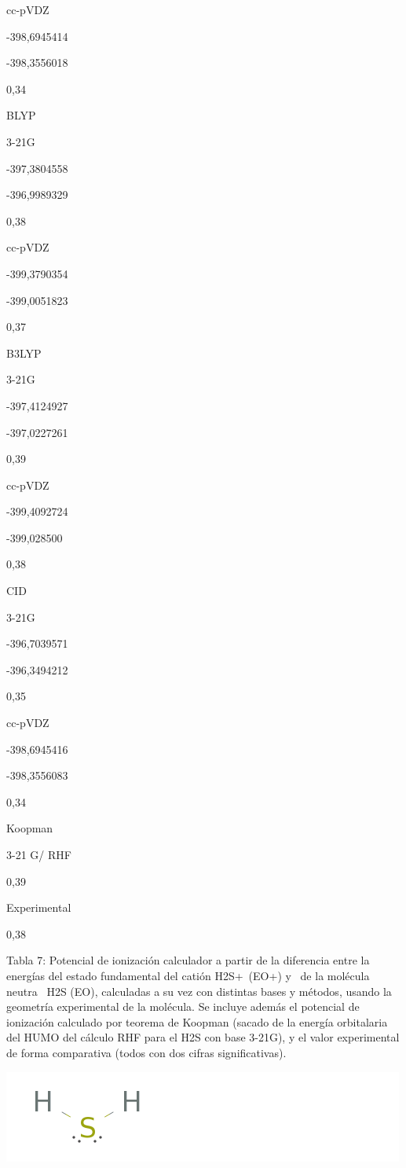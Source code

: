 \documentclass[]{article}
\begin{document}
{cc-pVDZ}

{-398,6945414}

{-398,3556018}

{0,34}

{BLYP}

{3-21G}

{-397,3804558}

{-396,9989329}

{0,38}

{cc-pVDZ}

{-399,3790354}

{-399,0051823}

{0,37}

{B3LYP}

{3-21G}

{-397,4124927}

{-397,0227261}

{0,39}

{cc-pVDZ}

{-399,4092724}

{-399,028500}

{0,38}

{CID}

{3-21G}

{-396,7039571}

{-396,3494212}

{0,35}

{cc-pVDZ}

{-398,6945416}

{-398,3556083}

{0,34}

{Koopman}

{3-21 G/ RHF}

{0,39}

{Experimental}

{}

{0,38}

{}

{Tabla 7}{: Potencial de ionización calculador a partir de la diferencia
entre la energías del estado fundamental del catión
H}{2}{S}{+}{~(E}{O}{+}{) y ~de la molécula neutra ~H}{2}{S (E}{O}{),
calculadas a su vez con distintas bases y métodos, usando la geometría
experimental de la molécula. Se incluye además el potencial de
ionización calculado por teorema de Koopman (sacado de la energía
orbitalaria del HUMO del cálculo RHF para el H}{2}{S con base 3-21G), y
el valor experimental de forma comparativa (todos con dos cifras
significativas).}

{\includegraphics{images/image8.gif}}
\end{document}
